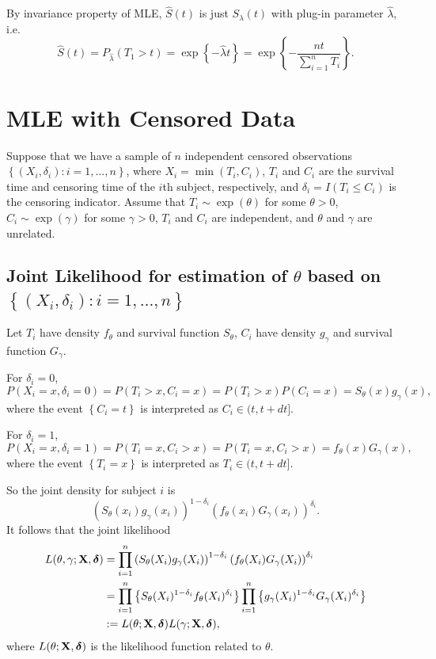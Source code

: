 \documentclass[11pt]{article}
\newcommand{\hS}{\hat{S}}
\newcommand{\hlam}{\hat{\lambda}}
\newcommand{\bX}{{\bf{X}}}
\newcommand{\bdelta}{{\bm \delta}}
\begin{document}
By invariance property of MLE, $\hS(t)$ is just $S_{\lambda}(t)$ with plug-in parameter $\hlam$, i.e.
\begin{equation*}
\hS(t) = P_{\hlam}(T_1> t) = \exp\left\{-\hlam t\right\} = \exp\left\{- \frac{nt}{\sum_{i=1}^nT_i}\right\}.
\end{equation*}

\section{MLE with Censored Data}

Suppose that we have a sample of $n$ independent censored observations $\left\{
  (X_i,\delta_i): i=1,\dots,n \right\}$, where $X_i = \min (T_i,C_i)$, $T_i$ and
$C_i$ are the survival time and censoring time of the $i$th subject,
respectively, and $\delta_i = I(T_i\leq C_i)$ is the censoring indicator.
Assume that $T_i\sim \exp(\theta)$ for some $\theta>0$, $C_i\sim \exp (\gamma)$
for some $\gamma>0$, $T_i$ and $C_i$ are independent, and $\theta$ and $\gamma$
are unrelated.

\subsection{Joint Likelihood for estimation of $\theta$ based on $\left\{
  (X_i,\delta_i): i=1,\dots,n \right\}$}

Let $T_i$ have density $f_{\theta}$ and survival function $S_{\theta}$, $C_i$
have density $g_{\gamma}$ and survival function $G_{\gamma}$.

For $\delta_i=0$,
\begin{equation*}
P(X_i=x,\delta_i=0) = P(T_i>x, C_i=x)=P(T_i>x)P(C_i=x) = S_{\theta}(x)g_{\gamma}(x),
\end{equation*}
where the event $\left\{ C_i=t \right\}$ is interpreted as $C_i\in (t,t+dt]$.

For $\delta_i=1$,
\begin{equation*}
P(X_i=x, \delta_i=1) = P(T_i=x, C_i>x) = P(T_i=x, C_i>x) = f_{\theta}(x)G_{\gamma}(x),
\end{equation*}
where the event $\left\{ T_i=x \right\}$ is interpreted as $T_i\in (t,t+dt]$.

So the joint density for subject $i$ is
\begin{equation*}
\left( S_{\theta}(x_i)g_{\gamma}(x_i) \right)^{1-\delta_i}\left( f_{\theta}(x_i)G_{\gamma}(x_i) \right)^{\delta_i}.
\end{equation*}
It follows that the joint likelihood
\begin{align*}
  L(\theta,\gamma;\bX,\bdelta) &= \prod_{i=1}^n \left( S_{\theta}(X_i)g_{\gamma}(X_i) \right)^{1-\delta_i}\left( f_{\theta}(X_i)G_{\gamma}(X_i) \right)^{\delta_i}\\
  &= \prod_{i=1}^n \left\{ S_{\theta}(X_i)^{1-\delta_i}f_{\theta}(X_i)^{\delta_i} \right\} \prod_{i=1}^n \left\{ g_{\gamma}(X_i)^{1-\delta_i} G_{\gamma}(X_i)^{\delta_i} \right\}\\
  &:= L(\theta;\bX,\bdelta) L(\gamma;\bX,\bdelta),
\end{align*}
where $L(\theta;\bX,\bdelta)$ is the likelihood function related to $\theta$.
\end{document}
